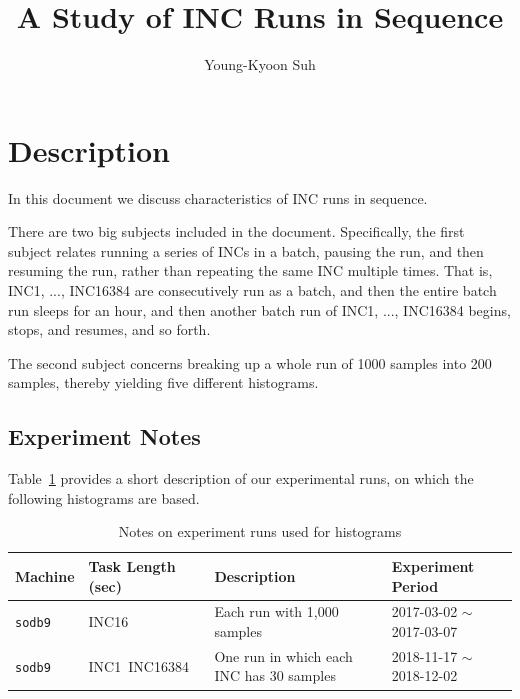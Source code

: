 \documentclass[10pt]{article}
\begin{document}
\title{A Study of INC Runs in Sequence}

\author{
Young-Kyoon Suh\\
}
\maketitle

\section{Description}
In this document we discuss characteristics of INC runs in sequence. 

There are two big subjects included in the document.
Specifically, the first subject relates running a series of INCs in a batch, pausing the run, and then resuming 
the run, rather than repeating the same INC multiple times. 
That is, INC1, ..., INC16384 are consecutively run as a batch, and 
then the entire batch run sleeps for an hour, and then 
another batch run of INC1, ..., INC16384 begins, stops, and resumes, and so forth.

The second subject concerns breaking up 
a whole run of 1000 samples into 200 samples, thereby yielding five different histograms. 

\subsection{Experiment Notes}
Table~\ref{tab:exp_notes} provides a short description of our experimental runs, 
on which the following histograms are based.

\begin{table}[h]
\begin{center}
\begin{tabular}{|p{2cm}|p{3cm}|p{6cm}|p{4cm}|} \hline
Machine & Task Length (sec) & Description & Experiment Period\\ \hline
{\tt sodb9} &  INC16 & Each run with 1,000 samples & 2017-03-02 $\sim$ 2017-03-07\\ \hline
{\tt sodb9} &  INC1~INC16384 & One run in which each INC has 30 samples & 2018-11-17 $\sim$ 2018-12-02\\ \hline
\end{tabular}
\end{center}
\vspace{-.2in}
\caption{Notes on experiment runs used for histograms\label{tab:exp_notes}}
\end{table}
\end{document}
